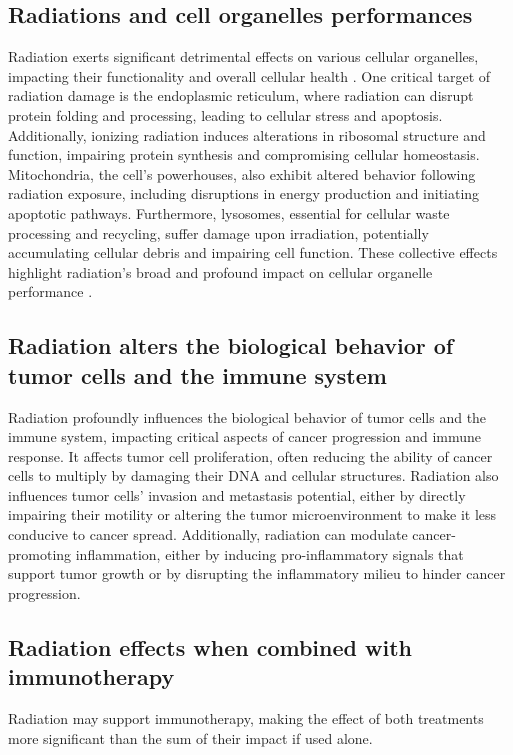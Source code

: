 \subsection{Radiations and cell organelles performances}
Radiation exerts significant detrimental effects on various cellular organelles, impacting their functionality and overall cellular health \cite{Somosy2000}.
One critical target of radiation damage is the endoplasmic reticulum, where radiation can disrupt protein folding and processing, leading to cellular stress and apoptosis.
Additionally, ionizing radiation induces alterations in ribosomal structure and function, impairing protein synthesis and compromising cellular homeostasis.
Mitochondria, the cell's powerhouses, also exhibit altered behavior following radiation exposure, including disruptions in energy production and initiating apoptotic pathways.
Furthermore, lysosomes, essential for cellular waste processing and recycling, suffer damage upon irradiation, potentially accumulating cellular debris and impairing cell function.
These collective effects highlight radiation's broad and profound impact on cellular organelle performance \cite{Wang2018}.

\subsection{Radiation alters the biological behavior of tumor cells and the immune system}
Radiation profoundly influences the biological behavior of tumor cells and the immune system, impacting critical aspects of cancer progression and immune response.
It affects tumor cell proliferation, often reducing the ability of cancer cells to multiply by damaging their DNA and cellular structures.
Radiation also influences tumor cells' invasion and metastasis potential, either by directly impairing their motility or altering the tumor microenvironment to make it less conducive to cancer spread.
Additionally, radiation can modulate cancer-promoting inflammation, either by inducing pro-inflammatory signals that support tumor growth or by disrupting the inflammatory milieu to hinder cancer progression.

\subsection{Radiation effects when combined with immunotherapy}
Radiation may support immunotherapy, making the effect of both treatments more significant than the sum of their impact if used alone.

